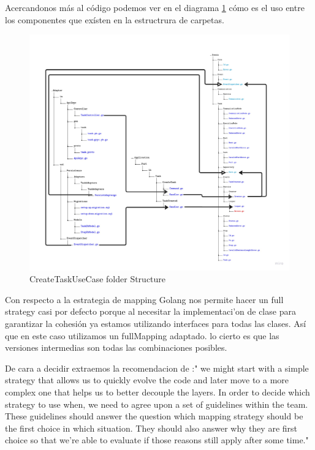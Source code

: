 Acercandonos más al código podemos ver en el diagrama \ref{fig:createTaskUseCaseArchitectureFolderStructure} cómo es el uso entre los componentes que exísten en la estructrura de carpetas.

\begin{figure}[H]
    \centering
    \includegraphics[height=0.5\textheight]{./part/Ejecucion/Seguimiento/CreateTaskUseCase/img/PFM - CreateUseCaseFolderStructure}
    \caption{CreateTaskUseCase folder Structure}\label{fig:createTaskUseCaseArchitectureFolderStructure}
\end{figure}

Con respecto a la estrategia de mapping Golang nos permite hacer un full strategy casi por defecto porque al necesitar la implementaci'on de clase para garantizar la cohesión ya estamos utilizando interfaces para todas las clases. Así que en este caso utilizamos un fullMapping adaptado. lo cierto es que las versiones intermedias son todas las combinaciones posibles.

De cara a decidir extraemos la recomendacion de  \cite{TomHombergs2019GYHD}:"
we might start with a simple strategy that allows us to quickly evolve the code and later move to a more complex one that helps us to better decouple the layers.
In order to decide which strategy to use when, we need to agree upon a set of guidelines within the team. These guidelines should answer the question which mapping strategy should be the first choice in which situation. They should also answer why they are first choice so that we’re able to evaluate if those reasons still apply after some time."

